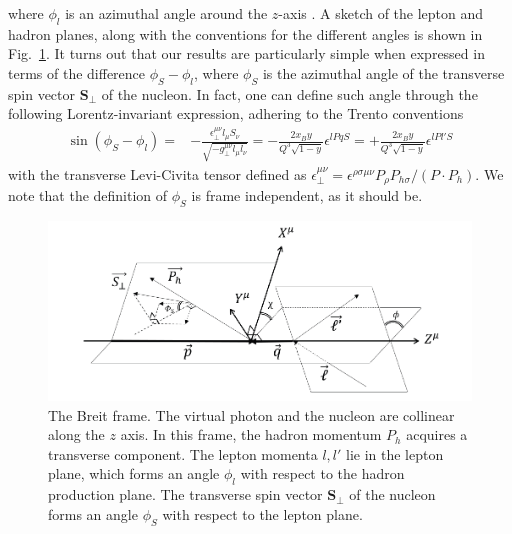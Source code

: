 where $\phi_l$ is an azimuthal angle around the $z$-axis \cite{kanazawa_contribution_2013}. A sketch of the lepton and hadron planes, along with the conventions for the different angles is shown in Fig.~\ref{fig:Breit frame}. It turns out that our results are particularly simple when expressed in terms of the difference $\phi_S-\phi_l$, where $\phi_S$ is the azimuthal angle of the transverse spin vector $\boldsymbol{S}_\perp$ of the nucleon. In fact, one can define such angle through the following Lorentz-invariant expression, adhering to the Trento conventions \cite{bacchetta_single-spin_2004}
\begin{equation}
\begin{aligned}
     \sin(\phi_S-\phi_l)=& -\frac{\epsilon_\perp^{\mu\nu}l_\mu S_\nu}{\sqrt{-g^{\mu\nu}_\perp l_\mu l_\nu}}=-\frac{2x_By}{Q^3\sqrt{1-y}}\epsilon^{lPqS}=+\frac{2x_By}{Q^3\sqrt{1-y}}\epsilon^{lPl'S}
\end{aligned}
\end{equation}
with the transverse Levi-Civita tensor defined as $\epsilon_\perp^{\mu\nu}=\epsilon^{\rho\sigma\mu\nu}P_\rho P_{h\sigma}/(P\cdot P_h)$. We note that the definition of $\phi_S$ is frame independent, as it should be.
\begin{figure}
    \centering
    \includegraphics[width=0.7\linewidth]{fig/frame.png}
    \caption{The Breit frame. The virtual photon and the nucleon are collinear along the $z$ axis. In this frame, the hadron momentum $P_h$ acquires a transverse component. The lepton momenta $l,l'$ lie in the lepton plane, which forms an angle $\phi_l$ with respect to the hadron production plane. The transverse spin vector $\boldsymbol{S}_\perp$ of the nucleon forms an angle $\phi_S$ with respect to the lepton plane.}
    \label{fig:Breit frame}
\end{figure}


